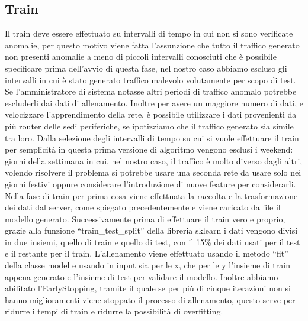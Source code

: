 \subsection{Train}
Il train deve essere effettuato su intervalli di tempo in cui non si sono verificate anomalie, per questo motivo viene fatta l'assunzione che tutto il traffico generato non presenti anomalie a meno di piccoli intervalli conosciuti che è possibile specificare prima dell'avvio di questa fase, nel nostro caso abbiamo escluso gli intervalli in cui è stato generato traffico malevolo volutamente per scopo di test. Se l'amministratore di sistema notasse altri periodi di traffico anomalo potrebbe escluderli dai dati di allenamento.
Inoltre per avere un maggiore numero di dati, e velocizzare l'apprendimento della rete, è possibile utilizzare i dati provenienti da più router delle sedi periferiche, se ipotizziamo che il traffico generato sia simile tra loro.
Dalla selezione degli intervalli di tempo su cui si vuole effettuare il train per semplicità in questa prima versione di algoritmo vengono esclusi i weekend: giorni della settimana in cui, nel nostro caso, il traffico è molto diverso dagli altri, volendo risolvere il problema si potrebbe usare una seconda rete da usare solo nei giorni festivi oppure considerare l'introduzione di nuove feature per considerarli. %
Nella fase di train per prima cosa viene effettuata la raccolta e la trasformazione dei dati dal server, come spiegato precedentemente e viene caricato da file il modello generato.
Successivamente prima di effettuare il train vero e proprio, grazie alla funzione ``train\_test\_split'' della libreria sklearn i dati vengono divisi in due insiemi, quello di train e quello di test, con il 15\% dei dati usati per il test e il restante per il train.
L'allenamento viene effettuato usando il metodo ``fit'' della classe model e usando in input sia per le x, che per le y l'insieme di train appena generato e l'insieme di test per validare il modello. Inoltre abbiamo abilitato l'EarlyStopping, tramite il quale se per più di cinque iterazioni non si hanno miglioramenti viene stoppato il processo di allenamento, questo serve per ridurre i tempi di train e ridurre la possibilità di overfitting.

